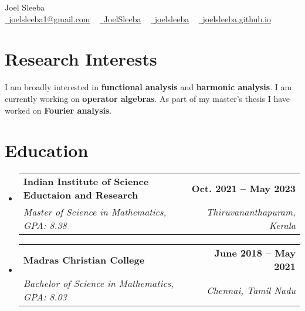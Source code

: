 \documentclass[letterpaper,11pt]{article}
\makeatletter
\newcommand{\resumeSubheading}[4]{
  \vspace{-2pt}\item
    \begin{tabular*}{1.0\textwidth}[t]{l@{\extracolsep{\fill}}r}
      \textbf{#1} & \textbf{\small #2} \\
      \textit{\small#3} & \textit{\small #4} \\
    \end{tabular*}\vspace{-7pt}
}
\newcommand{\resumeSubHeadingListStart}{\begin{itemize}[leftmargin=0.0in, label={}]}
\newcommand{\resumeSubHeadingListEnd}{\end{itemize}}
\makeatother
\begin{document}

\begin{center}
    {\Huge Joel Sleeba} \\ \vspace{5pt}
    \small \href{mailto:joelsleeba1@gmail.com}{\raisebox{-0.2\height}\faEnvelope\  \ul{joelsleeba1@gmail.com}} ~ 
    \href{https://twitter.com/JoelSleeba/}{\raisebox{-0.2\height}\faTwitter\ \ul{JoelSleeba}}  ~
    \href{https://github.com/joelsleeba}{\raisebox{-0.2\height}\faGithub\ \ul{joelsleeba}} ~
    \href{https://joelsleeba.github.io/}{\raisebox{-0.2\height}\faGlobe\ \ul{joelsleeba.github.io}}

    \vspace{-5pt}
\end{center}


\section{Research Interests}
I am broadly interested in {\bf functional analysis} and {\bf harmonic analysis}. I am currently working on {\bf operator algebras}. As part of my master's thesis I have worked on {\bf Fourier analysis}.
\vspace{-5pt}

\section{Education}
  \resumeSubHeadingListStart
    \resumeSubheading
      {Indian Institute of Science Eductaion and Research}{Oct. 2021 -- May 2023}
      {Master of Science in Mathematics, GPA: 8.38}{Thiruvananthapuram, Kerala}
  \resumeSubHeadingListEnd
  \vspace{-12pt}
  \resumeSubHeadingListStart
    \resumeSubheading
      {Madras Christian College}{June 2018 -- May 2021}
      {Bachelor of Science in Mathematics, GPA: 8.03}{Chennai, Tamil Nadu}
  \resumeSubHeadingListEnd
  \vspace{-8pt}
\end{document}
